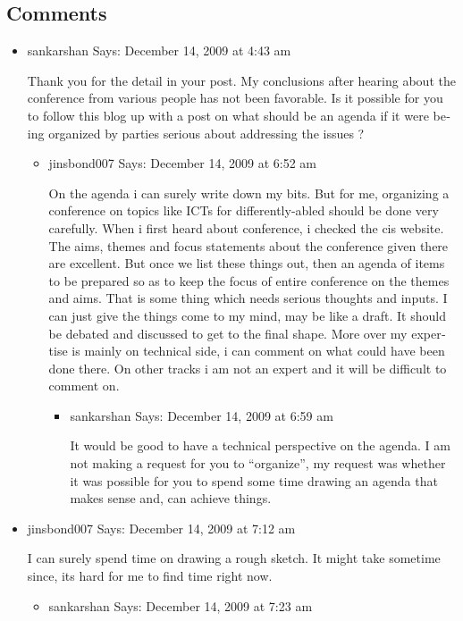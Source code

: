 \begin{english}
\subsection*{Comments}
\begin{itemize}
\item sankarshan Says:
December 14, 2009 at 4:43 am

Thank you for the detail in your post. My conclusions after hearing about the conference from various people has not been favorable. Is it possible for you to follow this blog up with a post on what should be an agenda if it were being organized by parties serious about addressing the issues ?
    \begin{itemize}
    \item jinsbond007 Says:
    December 14, 2009 at 6:52 am

    On the agenda i can surely write down my bits. But for me, organizing a conference on topics like ICTs for differently-abled should be done very carefully. When i first heard about conference, i checked the cis website. The aims, themes and focus statements about the conference given there are excellent. But once we list these things out, then an agenda of items to be prepared so as to keep the focus of entire conference on the themes and aims. That is some thing which needs serious thoughts and inputs. I can just give the things come to my mind, may be like a draft. It should be debated and discussed to get to the final shape. More over my expertise is mainly on technical side, i can comment on what could have been done there. On other tracks i am not an expert and it will be difficult to comment on.
        \begin{itemize}
	\item sankarshan Says:
        December 14, 2009 at 6:59 am

        It would be good to have a technical perspective on the agenda. I am not making a request for you to “organize”, my request was whether it was possible for you to spend some time drawing an agenda that makes sense and, can achieve things.
	\end{itemize}
    \end{itemize}

\item jinsbond007 Says:
December 14, 2009 at 7:12 am

I can surely spend time on drawing a rough sketch.
It might take sometime since, its hard for me to find time right now.

    \begin{itemize}
    \item sankarshan Says:
    December 14, 2009 at 7:23 am


\end{itemize}
\end{itemize}
\end{english}

